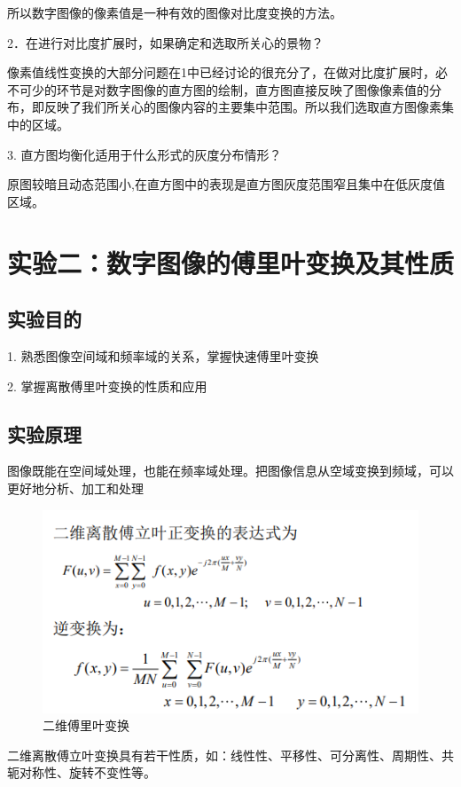 \documentclass[UTF8]{article} %
\begin{document}
	所以数字图像的像素值是一种有效的图像对比度变换的方法。
	
	2．在进行对比度扩展时，如果确定和选取所关心的景物？
	
	像素值线性变换的大部分问题在1中已经讨论的很充分了，在做对比度扩展时，必不可少的环节是对数字图像的直方图的绘制，直方图直接反映了图像像素值的分布，即反映了我们所关心的图像内容的主要集中范围。所以我们选取直方图像素集中的区域。
	
	3. 直方图均衡化适用于什么形式的灰度分布情形？

	原图较暗且动态范围小,在直方图中的表现是直方图灰度范围窄且集中在低灰度值区域。	

	\section{实验二：数字图像的傅里叶变换及其性质}
	\subsection{实验目的}
	1. 熟悉图像空间域和频率域的关系，掌握快速傅里叶变换
	
	2. 掌握离散傅里叶变换的性质和应用
	
	\subsection{实验原理}
	图像既能在空间域处理，也能在频率域处理。把图像信息从空域变换到频域，可以更好地分析、加工和处理
	\begin{figure}[H]
		\centering
		\includegraphics[width=0.7\linewidth]{screenshot037}
		\caption{二维傅里叶变换}
		\label{fig:screenshot037}
	\end{figure}

	二维离散傅立叶变换具有若干性质，如：线性性、平移性、可分离性、周期性、共轭对称性、旋转不变性等。
	
\end{document}
